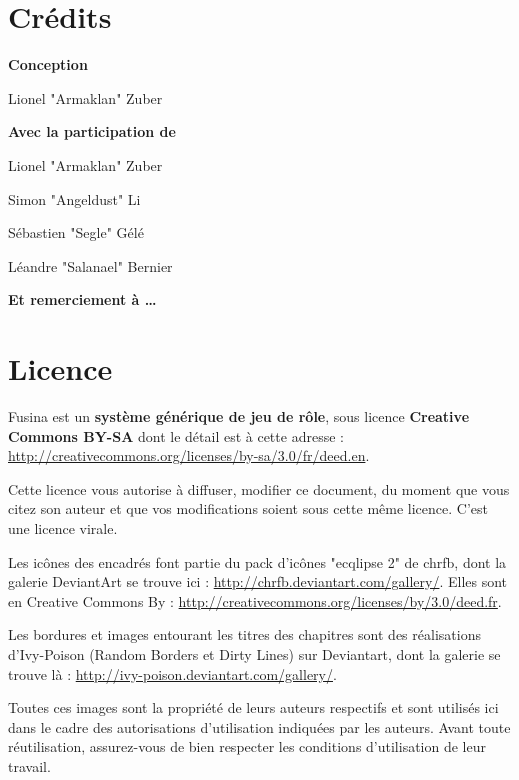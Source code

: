 \clearpage

\chapter*{Crédits}

\vskip 140pt

\begin{center}

\textbf{Conception}

Lionel "Armaklan" Zuber

\vskip 80pt

\textbf{Avec la participation de}

Lionel "Armaklan" Zuber

Simon "Angeldust" Li

Sébastien "Segle" Gélé

Léandre "Salanael" Bernier

\textbf{Et remerciement à \ldots}

\end{center}

\clearpage

\chapter*{Licence}

Fusina est un \textbf{système générique de jeu de rôle}, sous licence \textbf{Creative Commons BY-SA} dont le détail est à cette adresse : \url{http://creativecommons.org/licenses/by-sa/3.0/fr/deed.en}.

Cette licence vous autorise à diffuser, modifier ce document, du moment que vous citez son auteur et que vos modifications soient sous cette même licence. C'est une licence virale.

Les icônes des encadrés font partie du pack d'icônes "ecqlipse 2" de chrfb, dont la galerie DeviantArt se trouve ici : \url{http://chrfb.deviantart.com/gallery/}. Elles sont en Creative Commons By : \url{http://creativecommons.org/licenses/by/3.0/deed.fr}.

Les bordures et images entourant les titres des chapitres sont des réalisations d'Ivy-Poison (Random Borders et Dirty Lines) sur Deviantart, dont la galerie se trouve là : \url{http://ivy-poison.deviantart.com/gallery/}.

Toutes ces images sont la propriété de leurs auteurs respectifs et sont utilisés ici dans le cadre des autorisations d'utilisation indiquées par les auteurs. Avant toute réutilisation, assurez-vous de bien respecter les conditions d'utilisation de leur travail.

